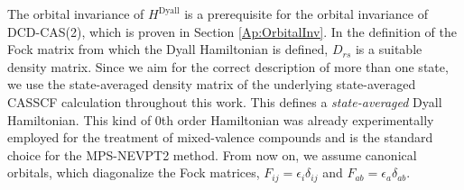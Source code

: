 The orbital invariance of $H^\text{Dyall}$ is a prerequisite for the orbital invariance of DCD-CAS(2), which is proven in Section \ref{Ap:OrbitalInv}.
In the definition of the Fock matrix from which the Dyall Hamiltonian is defined, $D_{rs}$ is a suitable density matrix. Since we aim for the correct description of more than one state, we use the state-averaged density matrix of the underlying state-averaged CASSCF calculation throughout this work. This defines a \emph{state-averaged} Dyall Hamiltonian. This kind of 0th order Hamiltonian was already experimentally employed for the treatment of mixed-valence compounds \cite{PastoHELMMAC_2008_174102, PastoHAELC_2009_12} and is the standard choice for the MPS-NEVPT2 method.\cite{SharmJA_2016_34103} From now on, we assume canonical orbitals, which diagonalize the Fock matrices, $F_{ij}=\epsilon_i \delta_{ij}$ and $F_{ab}=\epsilon_a \delta_{ab}$.

